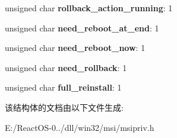 \begin{DoxyCompactItemize}
\item 
\mbox{\label{structtag_m_s_i_p_a_c_k_a_g_e_a5bb0b866e1eb3d2025fc3e1362619fbe}} 
unsigned char {\bfseries rollback\+\_\+action\+\_\+running}\+: 1
\item 
\mbox{\label{structtag_m_s_i_p_a_c_k_a_g_e_ad51b16165572c633425afccb07653542}} 
unsigned char {\bfseries need\+\_\+reboot\+\_\+at\+\_\+end}\+: 1
\item 
\mbox{\label{structtag_m_s_i_p_a_c_k_a_g_e_ad4ae4e60bd4ae025801e2ae67ef7fd61}} 
unsigned char {\bfseries need\+\_\+reboot\+\_\+now}\+: 1
\item 
\mbox{\label{structtag_m_s_i_p_a_c_k_a_g_e_aebf57dd37d156971086c8193ab88cb19}} 
unsigned char {\bfseries need\+\_\+rollback}\+: 1
\item 
\mbox{\label{structtag_m_s_i_p_a_c_k_a_g_e_a0b3061b4f0b657a6679c124b74e9f342}} 
unsigned char {\bfseries full\+\_\+reinstall}\+: 1
\end{DoxyCompactItemize}


该结构体的文档由以下文件生成\+:\begin{DoxyCompactItemize}
\item 
E\+:/\+React\+O\+S-\/0../dll/win32/msi/msipriv.\+h\end{DoxyCompactItemize}
